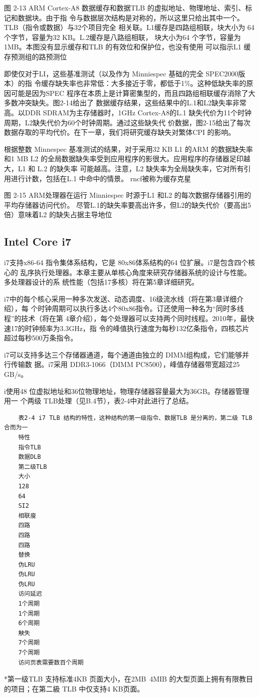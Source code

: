 图 2-13 ARM Cortex-A8 数据缓存和数据TLB 的虚拟地址、物理地址、索引、标记和数据块。由于指
令与数据层次结构是对称的，所以这里只给出其中一个。TLB（指令或数据）与32个项目完全
相关联。L1缓存是四路组相联，块大小为 64个字节，容量为32 KB。L.2缓存是八路组相联，
块大小为64 个字节，容量为1MB。本图没有显示缓存和TLB 的有效位和保护位，也没有使用
可以指示L1 缓存预测组的路预测位

即使仅对于LI，这些基准测试（以及作为 Minniespec 基础的完全 SPEC2000版本）的指
令缓存缺失率也非常低：大多接近于零，都低于1\%。这种低缺失率的原因可能是因为SPEC
程序在本质上是计算密集型的，而且四路组相联缓存消除了大多数冲突缺失。图2-14给出了
数据缓存结果，这些结果中的L.1和L2缺失率非常高。以DDR SDRAM为主存储器时，1GHz
Cortex-A8的L.1 缺失代价为11个时钟周期，L2缺失代价为60个时钟周期。通过这些缺失代
价数据，图2-15给出了每次数据存取的平均代价。在下一章，我们将研究缓存缺失对繁体CPI
的影响。


根据整数 Minnespec 基准测试的结果，对于采用32 KB L1 的ARM 的数据缺失率和1 MB L2
的全局数据缺失率受到应用程序的影很大。应用程序的存储器足印越大，L1 和 L.2 的缺失率
可能越高。注意，L2 缺失率为全局缺失率，它对所有引用进行计数，包括在L.1 中命中的情景。
rncf被称为缓存克星

图 2-15 ARM处理器在运行 Minniespec 时源于L1 和L2 的每次数据存储器引用的平均存储器访问代价。
尽管L.1的缺失率要高出许多，但L2的缺失代价（要高出5倍）意味着L2 的缺失占据主导地位

\subsection{Intel Core i7}
i7支持x86-64 指令集体系结构，它是 80x86体系结构的64 位扩展。i7是包含四个核心的
乱序执行处理器。本章主要从单核心角度来研究存储器系统的设计与性能。多处理器设计的系
统性能（包括17多核）将在第5章详细研究。

i7中的每个核心采用一种多次发送、动态调度、16级流水线（将在第3章详细介绍），每
个时钟周期可以执行多达4个80x86指令。订还使用一种名为“同时多线程”的技术（将在第
4章介绍），每个处理器可以支持两个同时线程。2010年，最快速17的时钟频率为3.3GHz，指
令的峰值执行速度为每秒132亿条指令，四核芯片超过每秒500万条指令。

i7可以支持多达三个存储器通道，每个通道由独立的 DIMM组构成，它们能够并行传输数
据。i7采用 DDR3-1066（DIMM PC8500），峰值存储器带宽超过25 GB/s。

i使用48 位虚拟地址和36位物理地址，物理存储器容量最大为36GB。存储器管理用一
个两级 TLB处理（见B.4节），表2-4中对此进行了总结。
\begin{verbatim}
    表2-4 i7 TLB 结构的特性，这种结构的第一级指令、数据TLB 是分离的，第二级 TLB 合而为一
    特性
    指令TLB
    数据DLB
    第二级TLB
    大小
    128
    64
    SI2
    相联廋
    四路
    四路
    四路
    替换
    伪LRU
    伪LRU
    伪LRU
    访问延迟
    1个周期
    1个周期
    6个周期
    觖失
    7个周期
    7个周期
    访问页表需要数百个周期
\end{verbatim}
*第一级TLB 支持标准4KB 页面大小，在2MB~4MIB 的大型页面上拥有有限教目的项目；在第二級 TLB 中仅支持4
KB页面。

